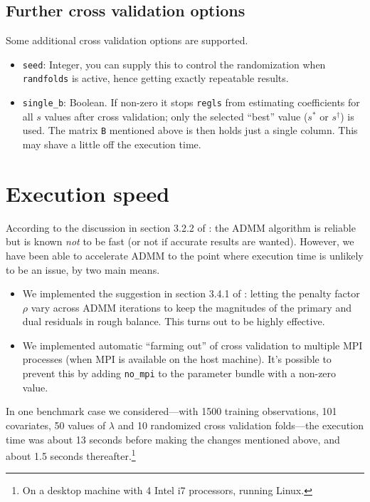 \documentclass{article}
\begin{document}
\subsection*{Further cross validation options}

Some additional cross validation options are supported.

\begin{itemize}
\item \texttt{seed}: Integer, you can supply this to control the
  randomization when \texttt{randfolds} is active, hence getting
  exactly repeatable results.
\item \texttt{single\_b}: Boolean. If non-zero it stops \texttt{regls}
  from estimating coefficients for all $s$ values after cross
  validation; only the selected ``best'' value ($s^*$ or
  $s^{\dagger}$) is used. The matrix \texttt{B} mentioned above is
  then holds just a single column. This may shave a little off the
  execution time.

\end{itemize}

\section{Execution speed}
\label{sec:speed}

According to the discussion in section 3.2.2 of \cite{boyd2010}: the
ADMM algorithm is reliable but is known \textit{not} to be fast (or
not if accurate results are wanted). However, we have been able to
accelerate ADMM to the point where execution time is unlikely to be an
issue, by two main means.
\begin{itemize}
\item We implemented the suggestion in section 3.4.1 of
  \cite{boyd2010}: letting the penalty factor $\rho$ vary across ADMM
  iterations to keep the magnitudes of the primary and dual residuals
  in rough balance. This turns out to be highly effective.
\item We implemented automatic ``farming out'' of cross validation to
  multiple \textsf{MPI} processes (when \textsf{MPI} is available on
  the host machine). It's possible to prevent this by adding
  \texttt{no\_mpi} to the parameter bundle with a non-zero value.
\end{itemize}
In one benchmark case we considered---with 1500 training observations,
101 covariates, 50 values of $\lambda$ and 10 randomized cross
validation folds---the execution time was about 13 seconds before
making the changes mentioned above, and about 1.5 seconds
thereafter.\footnote{On a desktop machine with 4 Intel i7 processors,
  running Linux.}
\end{document}
